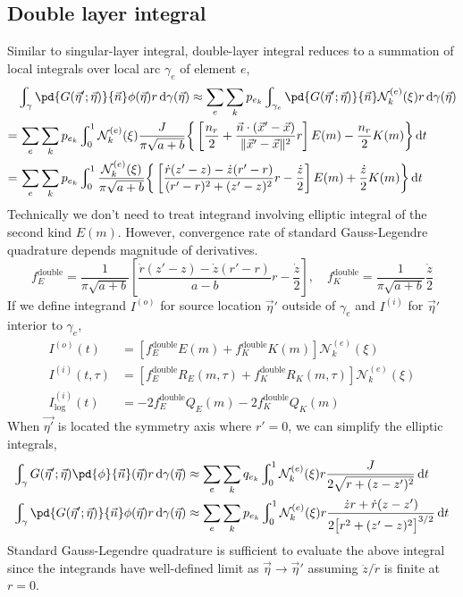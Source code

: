 \documentclass{jfm}
\begin{document}
\subsection{Double layer integral}
Similar to singular-layer integral, double-layer integral reduces to a summation of local integrals over local arc $\gamma_e$ of element $e$,
\begin{align}
&\nonumber\int_{\gamma}\pd{G(\vec{\eta}';\vec{\eta})}{\vec{n}}\phi(\vec{\eta}) r \,\mathrm{d}\gamma(\vec{\eta})
\approx\sum_e \sum_k p_{e_k}
\int_{\gamma_e}\pd{G(\vec{\eta}';\vec{\eta})}{\vec{n}}\mathcal{N}^{(e)}_k(\xi) r \,\mathrm{d}\gamma(\vec{\eta})\\
=&\nonumber\,\sum_e \sum_k p_{e_k}
\int_0^1\mathcal{N}^{(e)}_k(\xi)
\frac{J}{\pi \sqrt{a+b}}\bigg\{
\left[\frac{n_r}{2}+\frac{\vec{n}\cdot(\vec{x}'-\vec{x})}{\|\vec{x}'-\vec{x}\|^2}r\right]E(m)
-\frac{n_r}{2}K(m)\bigg\}
\,\mathrm{d}t\\
=&\,\sum_e \sum_k p_{e_k}
\int_0^1
\frac{\mathcal{N}^{(e)}_k(\xi)}{\pi \sqrt{a+b}}\bigg\{
\left[\frac{\dot{r}(z'-z)-\dot{z}(r'-r)}{(r'-r)^2+(z'-z)^2}r
-\frac{\dot{z}}{2}\right]E(m)
+\frac{\dot{z}}{2}K(m)\bigg\}
\,\mathrm{d}t
\end{align}
Technically we don't need to treat integrand involving elliptic integral of the second kind $E(m)$.
However, convergence rate of standard Gauss-Legendre quadrature  depends magnitude of derivatives.
\begin{equation}
f_E^\mathrm{double}=\frac{1}{\pi \sqrt{a+b}}
\left[\frac{\dot{r}(z'-z)-\dot{z}(r'-r)}{a-b}r
-\frac{\dot{z}}{2}\right],\quad
f_K^\mathrm{double}=\frac{1}{\pi \sqrt{a+b}}
\frac{\dot{z}}{2}
\end{equation}
If we define integrand $I^{(o)}$ for source location $\vec{\eta}'$ outside of $\gamma_e$
and $I^{(i)}$ for $\vec{\eta}'$ interior to $\gamma_e$,
\begin{align}
I^{(o)}(t) &= \left[ f_E^\mathrm{double} E(m)+f_K^\mathrm{double} K(m)\right]\mathcal{N}^{(e)}_k(\xi)\\
I^{(i)}(t,\tau) &= \left[f_E^\mathrm{double}R_E(m,\tau)+ f_K^\mathrm{double}R_K(m,\tau)\right]\mathcal{N}^{(e)}_k(\xi)\\
I^{(i)}_\mathrm{log}(t) &=-2 f_E^\mathrm{double}Q_E(m) -2 f_K^\mathrm{double}Q_K(m) 
\end{align}
When $\vec{\eta'}$ is located the symmetry axis where $r'=0$,
we can simplify the elliptic integrals,
\begin{align}
\int_{\gamma}G(\vec{\eta}';\vec{\eta})
\pd{\phi}{\vec{n}}(\vec{\eta}) r \,\mathrm{d}\gamma(\vec{\eta})
&\approx\sum_e \sum_k q_{e_k}
\int_0^1\mathcal{N}^{(e)}_k(\xi)r\frac{   J }{
2 \sqrt{r+(z-z')^2}}\,\mathrm{d}t\\
\int_{\gamma}\pd{G(\vec{\eta}';\vec{\eta})}{\vec{n}}\phi(\vec{\eta}) r \,\mathrm{d}\gamma(\vec{\eta})
&\approx\sum_e \sum_k p_{e_k}
\int_0^1\mathcal{N}^{(e)}_k(\xi)r \frac{  
\dot{z}r+\dot{r}(z-z')
}{
2\big[r^2+(z'-z)^2\big]^{3/2}
}\,\mathrm{d}t
\end{align}
Standard Gauss-Legendre quadrature is sufficient
to evaluate the above integral since
the integrands have well-defined limit as $\vec{\eta}\to\vec{\eta}'$
assuming $\ddot{z}/\dot{r}$ is finite at $r=0$.
\end{document}
